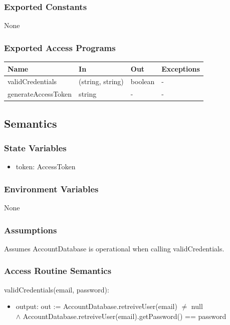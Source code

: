 \documentclass[12pt, titlepage]{article}
\begin{document}
\subsubsection{Exported Constants}
None
\subsubsection{Exported Access Programs}

\begin{center}
\begin{tabular}{p{4cm} p{4cm} p{4cm} p{2cm}}
\hline
\textbf{Name} & \textbf{In} & \textbf{Out} & \textbf{Exceptions} \\
\hline
validCredentials & (string, string) & boolean & - \\
generateAccessToken & string & - & - \\
\hline
\end{tabular}
\end{center}

\subsection{Semantics}

\subsubsection{State Variables}
\begin{itemize}
    \item token: AccessToken
\end{itemize}

\subsubsection{Environment Variables}
None

\subsubsection{Assumptions}
Assumes AccountDatabase is operational when calling validCredentials.

\subsubsection{Access Routine Semantics}

\noindent validCredentials(email, password):
\begin{itemize}
\item output: out := AccountDatabase.retreiveUser(email) $\neq$ null \\ $\land$ AccountDatabase.retreiveUser(email).getPassword() == password
\end{itemize}
\end{document}
